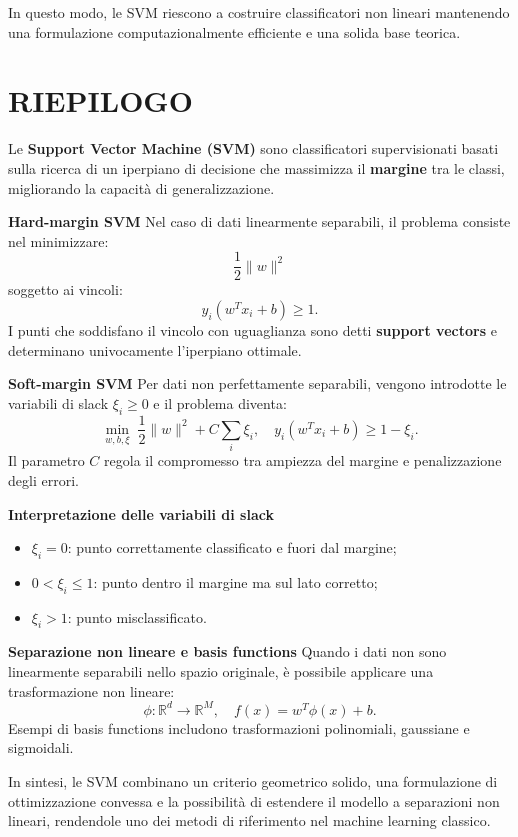 \documentclass[a4paper,12pt]{report}
\begin{document}
In questo modo, le SVM riescono a costruire classificatori non lineari mantenendo una formulazione computazionalmente efficiente e una solida base teorica.

\section{RIEPILOGO}

\begin{tcolorbox}[
    colback=green!10,
    colframe=green!50!black,
    title=Support Vector Machine -- Concetti chiave
]

Le \textbf{Support Vector Machine (SVM)} sono classificatori supervisionati basati sulla ricerca di un iperpiano di decisione che massimizza il \textbf{margine} tra le classi, migliorando la capacità di generalizzazione.

\medskip

\textbf{Hard-margin SVM}  
Nel caso di dati linearmente separabili, il problema consiste nel minimizzare:
\[
\frac{1}{2}\|w\|^2
\]
soggetto ai vincoli:
\[
y_i(w^T x_i + b) \geq 1.
\]
I punti che soddisfano il vincolo con uguaglianza sono detti \textbf{support vectors} e determinano univocamente l’iperpiano ottimale.

\medskip

\textbf{Soft-margin SVM}  
Per dati non perfettamente separabili, vengono introdotte le variabili di slack \( \xi_i \geq 0 \) e il problema diventa:
\[
\min_{w,b,\xi} \; \frac{1}{2}\|w\|^2 + C \sum_i \xi_i,
\quad
y_i(w^T x_i + b) \geq 1 - \xi_i.
\]
Il parametro \( C \) regola il compromesso tra ampiezza del margine e penalizzazione degli errori.

\medskip

\textbf{Interpretazione delle variabili di slack}
\begin{itemize}
    \item \( \xi_i = 0 \): punto correttamente classificato e fuori dal margine;
    \item \( 0 < \xi_i \leq 1 \): punto dentro il margine ma sul lato corretto;
    \item \( \xi_i > 1 \): punto misclassificato.
\end{itemize}

\medskip

\textbf{Separazione non lineare e basis functions}  
Quando i dati non sono linearmente separabili nello spazio originale, è possibile applicare una trasformazione non lineare:
\[
\phi : \mathbb{R}^d \rightarrow \mathbb{R}^M,
\quad
f(x) = w^T \phi(x) + b.
\]
Esempi di basis functions includono trasformazioni polinomiali, gaussiane e sigmoidali.

\medskip

In sintesi, le SVM combinano un criterio geometrico solido, una formulazione di ottimizzazione convessa e la possibilità di estendere il modello a separazioni non lineari, rendendole uno dei metodi di riferimento nel machine learning classico.

\end{tcolorbox}
\end{document}

